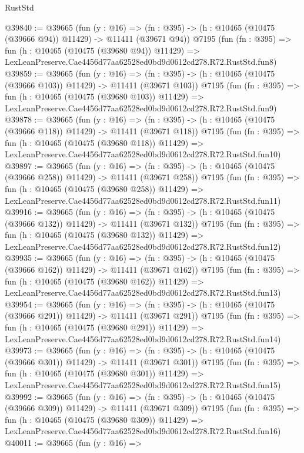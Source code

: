 \begin{lexlean}{RustStd}
\begin{coremodule}
@39840 := @39665
    (fun (y : @16) =>
    (fn : @395) -> (h : @10465 (@10475 (@39666 @94)) @11429) -> @11411 (@39671 @94))
    @7195
    (fun (fn : @395) =>
    fun (h : @10465 (@10475 (@39680 @94)) @11429) =>
    LexLeanPreserve.Cae4456d77aa62528ed0bd9d0612cd278.R72.RustStd.fun8)
@39859 := @39665
    (fun (y : @16) =>
    (fn : @395) -> (h : @10465 (@10475 (@39666 @103)) @11429) -> @11411 (@39671 @103))
    @7195
    (fun (fn : @395) =>
    fun (h : @10465 (@10475 (@39680 @103)) @11429) =>
    LexLeanPreserve.Cae4456d77aa62528ed0bd9d0612cd278.R72.RustStd.fun9)
@39878 := @39665
    (fun (y : @16) =>
    (fn : @395) -> (h : @10465 (@10475 (@39666 @118)) @11429) -> @11411 (@39671 @118))
    @7195
    (fun (fn : @395) =>
    fun (h : @10465 (@10475 (@39680 @118)) @11429) =>
    LexLeanPreserve.Cae4456d77aa62528ed0bd9d0612cd278.R72.RustStd.fun10)
@39897 := @39665
    (fun (y : @16) =>
    (fn : @395) -> (h : @10465 (@10475 (@39666 @258)) @11429) -> @11411 (@39671 @258))
    @7195
    (fun (fn : @395) =>
    fun (h : @10465 (@10475 (@39680 @258)) @11429) =>
    LexLeanPreserve.Cae4456d77aa62528ed0bd9d0612cd278.R72.RustStd.fun11)
@39916 := @39665
    (fun (y : @16) =>
    (fn : @395) -> (h : @10465 (@10475 (@39666 @132)) @11429) -> @11411 (@39671 @132))
    @7195
    (fun (fn : @395) =>
    fun (h : @10465 (@10475 (@39680 @132)) @11429) =>
    LexLeanPreserve.Cae4456d77aa62528ed0bd9d0612cd278.R72.RustStd.fun12)
@39935 := @39665
    (fun (y : @16) =>
    (fn : @395) -> (h : @10465 (@10475 (@39666 @162)) @11429) -> @11411 (@39671 @162))
    @7195
    (fun (fn : @395) =>
    fun (h : @10465 (@10475 (@39680 @162)) @11429) =>
    LexLeanPreserve.Cae4456d77aa62528ed0bd9d0612cd278.R72.RustStd.fun13)
@39954 := @39665
    (fun (y : @16) =>
    (fn : @395) -> (h : @10465 (@10475 (@39666 @291)) @11429) -> @11411 (@39671 @291))
    @7195
    (fun (fn : @395) =>
    fun (h : @10465 (@10475 (@39680 @291)) @11429) =>
    LexLeanPreserve.Cae4456d77aa62528ed0bd9d0612cd278.R72.RustStd.fun14)
@39973 := @39665
    (fun (y : @16) =>
    (fn : @395) -> (h : @10465 (@10475 (@39666 @301)) @11429) -> @11411 (@39671 @301))
    @7195
    (fun (fn : @395) =>
    fun (h : @10465 (@10475 (@39680 @301)) @11429) =>
    LexLeanPreserve.Cae4456d77aa62528ed0bd9d0612cd278.R72.RustStd.fun15)
@39992 := @39665
    (fun (y : @16) =>
    (fn : @395) -> (h : @10465 (@10475 (@39666 @309)) @11429) -> @11411 (@39671 @309))
    @7195
    (fun (fn : @395) =>
    fun (h : @10465 (@10475 (@39680 @309)) @11429) =>
    LexLeanPreserve.Cae4456d77aa62528ed0bd9d0612cd278.R72.RustStd.fun16)
@40011 := @39665
    (fun (y : @16) =>

\end{coremodule}
\end{lexlean}
